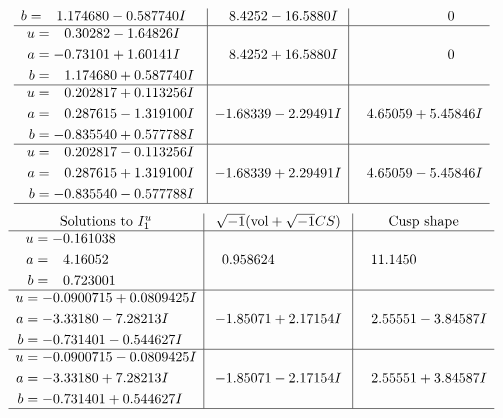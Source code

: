 \documentclass[1p]{elsarticle_modified}
\theoremstyle{definition}
\newcommand{\I}{\sqrt{-1}}
\begin{document}
$$\begin{array}{c|c|c}
\begin{aligned}
b &= \phantom{-}1.174680 - 0.587740 I\end{aligned}
 & \phantom{-}8.4252 - 16.5880 I & \phantom{-0.000000 } 0 \\ \hline\begin{aligned}
u &= \phantom{-}0.30282 - 1.64826 I \\
a &= -0.73101 + 1.60141 I \\
b &= \phantom{-}1.174680 + 0.587740 I\end{aligned}
 & \phantom{-}8.4252 + 16.5880 I & \phantom{-0.000000 } 0 \\ \hline\begin{aligned}
u &= \phantom{-}0.202817 + 0.113256 I \\
a &= \phantom{-}0.287615 - 1.319100 I \\
b &= -0.835540 + 0.577788 I\end{aligned}
 & -1.68339 - 2.29491 I & \phantom{-}4.65059 + 5.45846 I \\ \hline\begin{aligned}
u &= \phantom{-}0.202817 - 0.113256 I \\
a &= \phantom{-}0.287615 + 1.319100 I \\
b &= -0.835540 - 0.577788 I\end{aligned}
 & -1.68339 + 2.29491 I & \phantom{-}4.65059 - 5.45846 I\\
 \hline 
 \end{array}$$\newpage$$\begin{array}{c|c|c}  
\text{Solutions to }I^u_{1}& \I (\text{vol} + \sqrt{-1}CS) & \text{Cusp shape}\\
 \hline 
\begin{aligned}
u &= -0.161038\phantom{ +0.000000I} \\
a &= \phantom{-}4.16052\phantom{ +0.000000I} \\
b &= \phantom{-}0.723001\phantom{ +0.000000I}\end{aligned}
 & \phantom{-}0.958624\phantom{ +0.000000I} & \phantom{-}11.1450\phantom{ +0.000000I} \\ \hline\begin{aligned}
u &= -0.0900715 + 0.0809425 I \\
a &= -3.33180 - 7.28213 I \\
b &= -0.731401 - 0.544627 I\end{aligned}
 & -1.85071 + 2.17154 I & \phantom{-}2.55551 - 3.84587 I \\ \hline\begin{aligned}
u &= -0.0900715 - 0.0809425 I \\
a &= -3.33180 + 7.28213 I \\
b &= -0.731401 + 0.544627 I\end{aligned}
 & -1.85071 - 2.17154 I & \phantom{-}2.55551 + 3.84587 I\\
 \hline 
 \end{array}$$\newpage\newpage\renewcommand{\arraystretch}{1}
\end{document}
